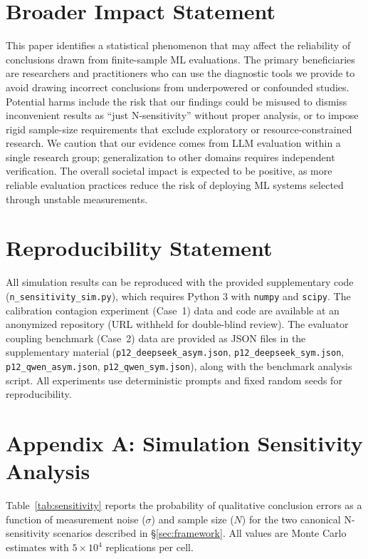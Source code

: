 \documentclass[11pt]{article}
\begin{document}
\section*{Broader Impact Statement}

This paper identifies a statistical phenomenon that may affect the reliability of conclusions drawn from finite-sample ML evaluations. The primary beneficiaries are researchers and practitioners who can use the diagnostic tools we provide to avoid drawing incorrect conclusions from underpowered or confounded studies. Potential harms include the risk that our findings could be misused to dismiss inconvenient results as ``just N-sensitivity'' without proper analysis, or to impose rigid sample-size requirements that exclude exploratory or resource-constrained research. We caution that our evidence comes from LLM evaluation within a single research group; generalization to other domains requires independent verification. The overall societal impact is expected to be positive, as more reliable evaluation practices reduce the risk of deploying ML systems selected through unstable measurements.

\section*{Reproducibility Statement}

All simulation results can be reproduced with the provided supplementary code (\texttt{n\_sensitivity\_sim.py}), which requires Python 3 with \texttt{numpy} and \texttt{scipy}. The calibration contagion experiment (Case~1) data and code are available at an anonymized repository (URL withheld for double-blind review). The evaluator coupling benchmark (Case~2) data are provided as JSON files in the supplementary material (\texttt{p12\_deepseek\_asym.json}, \texttt{p12\_deepseek\_sym.json}, \texttt{p12\_qwen\_asym.json}, \texttt{p12\_qwen\_sym.json}), along with the benchmark analysis script. All experiments use deterministic prompts and fixed random seeds for reproducibility.

\section*{Appendix A: Simulation Sensitivity Analysis}

Table~\ref{tab:sensitivity} reports the probability of qualitative conclusion errors as a function of measurement noise ($\sigma$) and sample size ($N$) for the two canonical N-sensitivity scenarios described in \S\ref{sec:framework}. All values are Monte Carlo estimates with $5{\times}10^4$ replications per cell.
\end{document}
